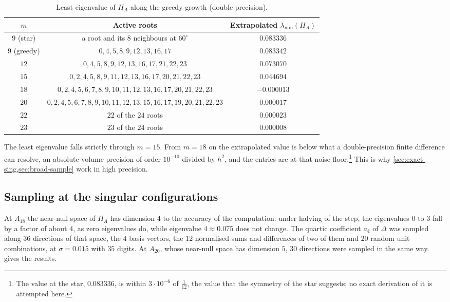 \documentclass[11pt,reqno]{amsart}
\renewcommand{\_}{\origunderscore\allowbreak}
\numberwithin{equation}{section}
\theoremstyle{plain}
\theoremstyle{definition}
\theoremstyle{remark}
\newcommand{\defect}{\Delta}                 %
\begin{document}
\begin{table}[ht]
\centering
\caption{Least eigenvalue of $H_A$ along the greedy growth (double precision).}\label{tab:dense}
\footnotesize
\renewcommand{\arraystretch}{1.2}
\setlength{\tabcolsep}{4pt}
\begin{tabular}{ccc}
\toprule
$m$ & Active roots & Extrapolated $\lambda_{\min}(H_A)$\\
\midrule
$9$ (star) & a root and its $8$ neighbours at $60^\circ$ & $0.083336$\\
$9$ (greedy) & $0,4,5,8,9,12,13,16,17$ & $0.083342$\\
$12$ & $0,4,5,8,9,12,13,16,17,21,22,23$ & $0.073070$\\
$15$ & $0,2,4,5,8,9,11,12,13,16,17,20,21,22,23$ & $0.044694$\\
$18$ & $0,2,4,5,6,7,8,9,10,11,12,13,16,17,20,21,22,23$ & $-0.000013$\\
$20$ & $0,2,4,5,6,7,8,9,10,11,12,13,15,16,17,19,20,21,22,23$ & $0.000017$\\
$22$ & $22$ of the $24$ roots & $0.000023$\\
$23$ & $23$ of the $24$ roots & $0.000008$\\
\bottomrule
\end{tabular}
\end{table}

The least eigenvalue falls strictly through $m=15$. From $m=18$ on the
extrapolated value is below what a double-precision finite difference can
resolve, an absolute volume precision of order $10^{-10}$ divided by
$h^2$, and the entries are at that noise floor.\footnote{The value at the
  star, $0.083336$, is within $3\cdot10^{-6}$ of $\frac1{12}$, the value
  that the symmetry of the star suggests; no exact derivation of it is
  attempted here.} This is why \cref{sec:exact-sing,sec:broad-sample}
work in high precision.

\subsection*{Sampling at the singular configurations}

At $A_{18}$ the near-null space of $H_A$ has dimension $4$ to the accuracy
of the computation: under halving of the step, the eigenvalues $0$ to $3$
fall by a factor of about $4$, as zero eigenvalues do, while eigenvalue
$4\approx0.075$ does not change. The quartic coefficient $a_4$ of $\defect$
was sampled along $36$ directions of that space, the $4$ basis vectors,
the $12$ normalised sums and differences of two of them and $20$ random
unit combinations, at $\sigma=0.015$ with $35$ digits. At $A_{20}$, whose
near-null space has dimension $5$, $30$ directions were sampled in the
same way.  gives the results.
\end{document}
